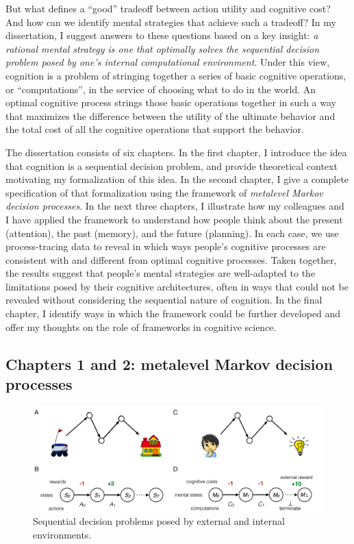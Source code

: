 \documentclass[11pt,a4paperpaper,]{article}
\begin{document}
But what defines a ``good'' tradeoff between action utility and cognitive cost? And how can we identify mental strategies that achieve such a tradeoff? In my dissertation, I suggest answers to these questions based on a key insight: \emph{a rational mental strategy is one that optimally solves the sequential decision problem posed by one's internal computational environment}. Under this view, cognition is a problem of stringing together a series of basic cognitive operations, or ``computations'', in the service of choosing what to do in the world. An optimal cognitive process strings those basic operations together in such a way that maximizes the difference between the utility of the ultimate behavior and the total cost of all the cognitive operations that support the behavior.

The dissertation consists of six chapters. In the first chapter, I introduce the idea that cognition is a sequential decision problem, and provide theoretical context motivating my formalization of this idea. In the second chapter, I give a complete specification of that formalization using the framework of \emph{metalevel Markov decision processes}. In the next three chapters, I illustrate how my colleagues and I have applied the framework to understand how people think about the present (attention), the past (memory), and the future (planning). In each case, we use process-tracing data to reveal in which ways people's cognitive processes are consistent with and different from optimal cognitive processes. Taken together, the results suggest that people's mental strategies are well-adapted to the limitations posed by their cognitive architectures, often in ways that could not be revealed without considering the sequential nature of cognition. In the final chapter, I identify ways in which the framework could be further developed and offer my thoughts on the role of frameworks in cognitive science.


\subsection{Chapters 1 and 2: metalevel Markov decision processes}\label{formal-framework-metalevel-mdps}


\begin{figure}[tbp]
  \centering
  \includegraphics[width=\textwidth]{diagrams/precis/intro.pdf}
  \caption{Sequential decision problems posed by external and internal environments.}
  \label{fig:sequential-intuition}
\end{figure}
\end{document}
